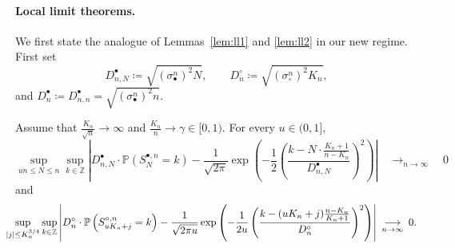 \documentclass[10pt]{amsart}
\theoremstyle{definition}\newtheorem{defi}[theo]{Definition}\newtheorem{rema}[theo]{Remark}\newtheorem{exam}[theo]{Example}\newtheorem{exem}[theo]{Example}\newtheorem{nota}[theo]{Notation}
\newcommand{\Z}{\mathbb{Z}}
\def\scn{\sigma_{\circ}^{n}}
\def\sbn{\sigma_{\bullet}^{n}}
\def\Sbn{S^{\bullet,n}}
\def\Scn{S^{\circ,n}}
\def\DbnN{D^{\bullet}_{n,N}}
\def\Dbn{D^{\bullet}_{n}}
\def\Dcn{D^{\circ}_{n}}
\renewcommand\Pr[1]{\mathbb{P}\left(#1\right)}
\begin{document}
\paragraph*{Local limit theorems.} We first state the analogue of Lemmas~\ref{lem:ll1} and \ref{lem:ll2} in our new regime.
First set
\[\DbnN \coloneqq \sqrt{ (\sbn)^{2}  N}, \qquad \Dcn \coloneqq\sqrt{ (\scn)^{2} K_{n} },\]
and $\Dbn \coloneqq D^{\bullet}_{n,n}= \sqrt{ (\sbn)^{2}  n}$.

\begin{lemma}
\label{lem:locallimitbis}
Assume that $\tfrac{K_{n}}{\sqrt{n}} \rightarrow  \infty$ and $\tfrac{K_{n}}{n}   \rightarrow  \gamma \in [0,1)$.
For every $u \in (0,1]$,
\begin{equation}
\label{eq:ext1}\sup_{un \leq N \leq n} \sup_{k \in \Z  } \left|  \DbnN  \cdot \Pr{\Sbn_N=k}
  -    \frac{1}{\sqrt{2 \pi}}\exp \left(-   \frac{1}{2}\left( \frac{k-  N \cdot  \frac{K_{n}+1}{n-K_{n}}}
  {  \DbnN  } \right)^{2}\right)\right|  \quad \mathop{\longrightarrow}_{n \rightarrow \infty} \quad 0
\end{equation}
and
\begin{equation}
  \label{eq:ext2} \hspace{-3.5mm} \sup_{|j| \leq K_{n}^{3/4}} \sup_{k \in \Z} \left|  \Dcn \cdot \Pr{\Scn_{ uK_{n}  + j }=k} -  \frac{1}{\sqrt{2 \pi u}} \exp \left(  - \frac{1}{2u} \left( \frac{k- (uK_{n}+j) \frac{n-K_{n}}{K_{n}+1}}{\Dcn} \right)^{2} \right)\right|  \ \mathop{\longrightarrow}_{n \rightarrow \infty} \ 0.
\end{equation}
\end{lemma}
\end{document}
